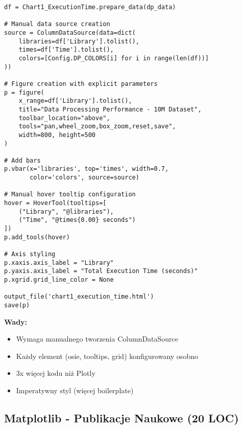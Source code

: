 \documentclass[a4paper,11pt]{article}
\begin{document}
\begin{lstlisting}[caption={Chart 1: Execution Time - Bokeh Implementation},label={lst:chart1_bokeh}]
df = Chart1_ExecutionTime.prepare_data(dp_data)

# Manual data source creation
source = ColumnDataSource(data=dict(
    libraries=df['Library'].tolist(),
    times=df['Time'].tolist(),
    colors=[Config.DP_COLORS[i] for i in range(len(df))]
))

# Figure creation with explicit parameters
p = figure(
    x_range=df['Library'].tolist(),
    title="Data Processing Performance - 10M Dataset",
    toolbar_location="above",
    tools="pan,wheel_zoom,box_zoom,reset,save",
    width=800, height=500
)

# Add bars
p.vbar(x='libraries', top='times', width=0.7, 
       color='colors', source=source)

# Manual hover tooltip configuration
hover = HoverTool(tooltips=[
    ("Library", "@libraries"),
    ("Time", "@times{0.00} seconds")
])
p.add_tools(hover)

# Axis styling
p.xaxis.axis_label = "Library"
p.yaxis.axis_label = "Total Execution Time (seconds)"
p.xgrid.grid_line_color = None

output_file('chart1_execution_time.html')
save(p)
\end{lstlisting}

\textbf{Wady:}
\begin{itemize}
    \item Wymaga manualnego tworzenia ColumnDataSource
    \item Każdy element (osie, tooltips, grid) konfigurowany osobno
    \item 3x więcej kodu niż Plotly
    \item Imperatywny styl (więcej boilerplate)
\end{itemize}

\subsection{Matplotlib - Publikacje Naukowe (20 LOC)}
\end{document}
